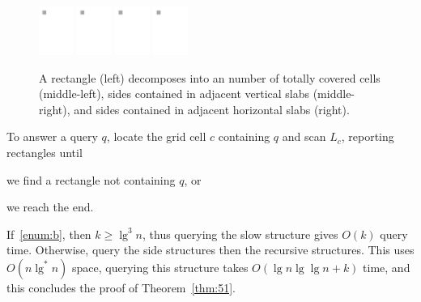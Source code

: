 \documentclass[letterpaper,12pt,twocolumn]{article}
\newcommand{\BigOh}[1]{O\!\left(#1\right)}
\theoremstyle{plain}
\begin{document}
\begin{figure}[t!]
  \centering
    \includegraphics[width=0.10\textwidth,page=1]{figures/grid-decomposition}
    \includegraphics[width=0.10\textwidth,page=2]{figures/grid-decomposition}
    \includegraphics[width=0.10\textwidth,page=4]{figures/grid-decomposition}
    \includegraphics[width=0.10\textwidth,page=3]{figures/grid-decomposition}
  \caption[Grid decomposition]{A rectangle (left) decomposes into an
    number of totally covered cells (middle-left), sides contained in
    adjacent vertical slabs (middle-right), and sides contained in
    adjacent horizontal slabs (right).}\label{fig:grid:decomposition}
\end{figure}

To answer a query $q$, locate the grid cell $c$ containing $q$ and
scan $L_c$, reporting rectangles until
%
\begin{enumerate*}[label=(\alph*)] %
\item\label{enum:a} we find a rectangle not containing $q$, or
\item\label{enum:b} we reach the end.
\end{enumerate*}

If~\ref{enum:b}, then $k \ge \lg^3 n$, thus querying the slow
structure gives $\BigOh{k}$ query time.  Otherwise, query the side
structures then the recursive structures.  This uses $\BigOh{n\lg^*
  n}$ space, querying this structure takes $\BigOh{\lg n\lg\lg n + k}$
time, and this concludes the proof of Theorem~\ref{thm:51}.



\end{document}

